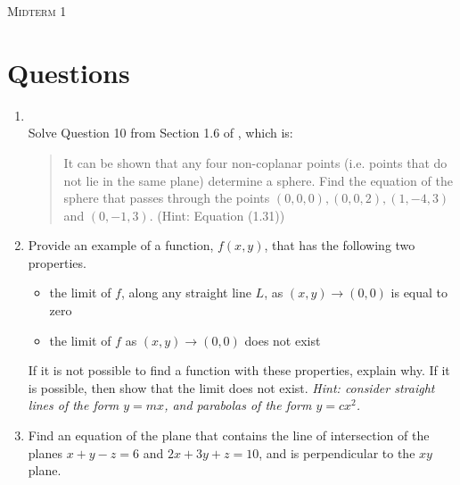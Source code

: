 \documentclass{article}
\date{}
\begin{document}
\begin{center}
\textsc{\LARGE Midterm 1}\\[0.5cm]
\end{center}
\section*{Questions}

\begin{enumerate}
\item 
{}\\
Solve Question 10 from Section 1.6 of \VCT, which is: 
\begin{quotation}
\noindent
It can be shown that any four non-coplanar points (i.e. points that do not lie in the same plane) determine a sphere. Find the equation of the sphere that passes through the points $(0, 0, 0), (0, 0, 2), (1, -4, 3)$ and $(0, -1, 3)$. (Hint: Equation (1.31))
\end{quotation}
\item 
Provide an example of a function, $f(x,y)$, that has the following two properties.
\begin{itemize}
\item the limit of $f$, along any straight line $L$, as $(x,y) \rightarrow (0,0)$ is equal to zero
\item the limit of $f$ as $(x,y) \rightarrow (0,0)$ does not exist
\end{itemize}
If it is not possible to find a function with these properties, explain why. If it is possible, then show that the limit does not exist.    \textit{Hint: consider straight lines of the form $y=mx$, and parabolas of the form $y=cx^2$.}
\item 
Find an equation of the plane that contains the line of intersection of the planes $x+y-z=6$ and $2x+3y+z=10$, and is perpendicular to the $xy$ plane.


\end{enumerate}
\end{document}
